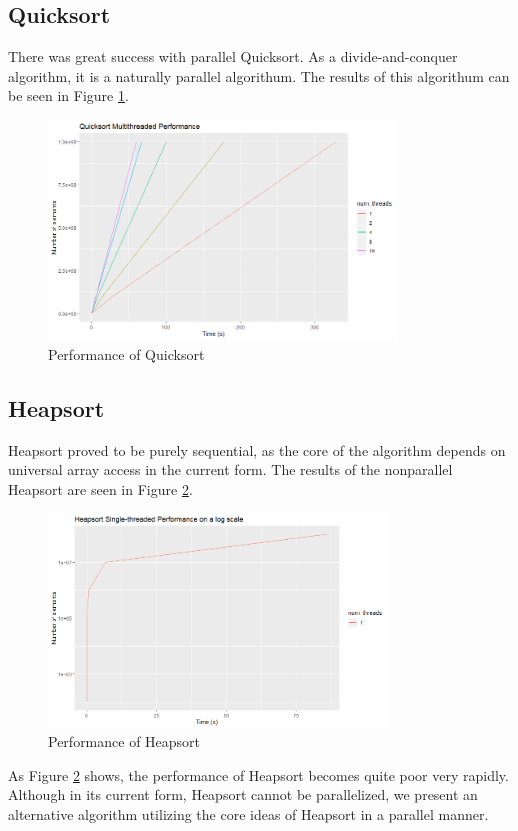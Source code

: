 \documentclass[conference]{IEEEtran}
\begin{document}
    \subsection{Quicksort}
    There was great success with parallel Quicksort. 
    As a divide-and-conquer algorithm, it is a naturally parallel algorithum. 
    The results of this algorithum can be seen in Figure \ref{qck_per}. 
    \begin{figure}[h]
        \includegraphics[width=9.25cm]{qs_mt.png} 
        \caption{Performance of Quicksort}
        \label{qck_per}
    \end{figure}
    
    

    \subsection{Heapsort}
    Heapsort proved to be purely sequential, as the core of the algorithm depends on universal array access in the current form. 
    The results of the nonparallel Heapsort are seen in Figure \ref{hs_per}. 
    \begin{figure}[h]
        \includegraphics[width=9cm]{hs_per.png} 
        \caption{Performance of Heapsort}
        \label{hs_per}
    \end{figure}
    As Figure \ref{hs_per} shows, the performance of Heapsort becomes quite poor very rapidly. 
    Although in its current form, Heapsort cannot be parallelized, we present an alternative algorithm utilizing the core ideas of Heapsort in a parallel manner. 
    
\end{document}
